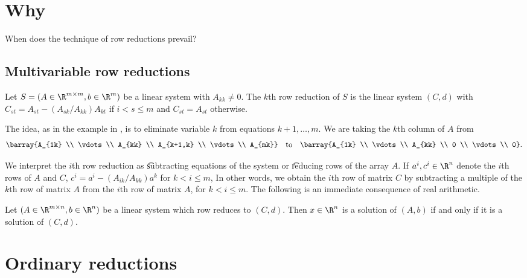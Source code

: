 
\section*{Why}

When does the technique of row reductions prevail?

\subsection*{Multivariable row reductions}

Let $S = (A \in \R ^{m \times m}, b \in \R ^{m})$ be a linear system with $A_{kk} \neq 0$.
The \t{$k$th row reduction} of $S$ is the linear system $(C, d)$ with $C_{st} = A_{st} - (A_{sk}/A_{kk})A_{kt}$ if $i < s \leq m$ and $C_{st} = A_{st}$ otherwise.

The idea, as in the example in , is to eliminate variable $k$ from equations $k+1, \dots , m$.
We are taking the $k$th column of $A$ from
\[
\barray{A_{1k} \\ \vdots \\ A_{kk} \\ A_{k+1,k} \\ \vdots \\ A_{mk}} \quad \text{to} \quad \barray{A_{1k} \\ \vdots \\ A_{kk} \\ 0 \\ \vdots \\ 0}.
\]

We interpret the $i$th row reduction as \t{subtracting equations} of the system or \t{reducing rows} of the array $A$.
If $a^i, c^i \in \R ^{n}$ denote the $i$th rows of $A$ and $C$, $c^i = a^i - (A_{ik}/A_{kk})a^k$ for $k < i \leq m$,
In other words, we obtain the $i$th row of matrix $C$ by subtracting a multiple of the $k$th row of matrix $A$ from the $i$th row of matrix $A$, for $k < i \leq m$.
The following is an immediate consequence of real arithmetic.

\begin{proposition}

\label{proposition:ordinaryrowreductions:basic}Let $(A \in \R ^{m \times  n}, b \in \R ^{n})$ be a linear system which row reduces to $(C, d)$.
Then $x \in \R ^{n}$ is a solution of $(A, b)$ if and only if it is a solution of $(C, d)$.
\end{proposition}

\section*{Ordinary reductions}

